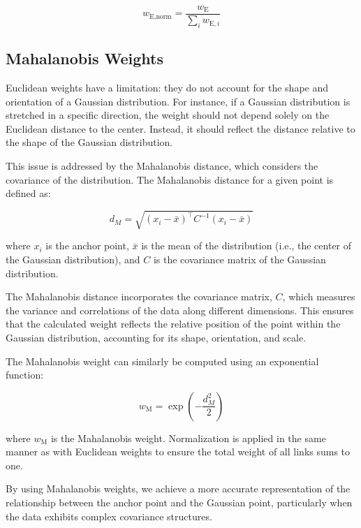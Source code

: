 \[
w_{\text{E}, \text{norm}} = \frac{w_{\text{E}}}{\sum_{i} w_{\text{E}, i}}
\]

\subsection{Mahalanobis Weights}

Euclidean weights have a limitation: they do not account for the shape and orientation of a Gaussian distribution. For instance, if a Gaussian distribution is stretched in a specific direction, the weight should not depend solely on the Euclidean distance to the center. Instead, it should reflect the distance relative to the shape of the Gaussian distribution.

This issue is addressed by the Mahalanobis distance, which considers the covariance of the distribution. The Mahalanobis distance for a given point is defined as:

\[
d_M = \sqrt{(x_i - \bar{x})^\top C^{-1} (x_i - \bar{x})}
\]

where \(x_i\) is the anchor point, \(\bar{x}\) is the mean of the distribution (i.e., the center of the Gaussian distribution), and \(C\) is the covariance matrix of the Gaussian distribution.

The Mahalanobis distance incorporates the covariance matrix, \(C\), which measures the variance and correlations of the data along different dimensions. This ensures that the calculated weight reflects the relative position of the point within the Gaussian distribution, accounting for its shape, orientation, and scale. 

The Mahalanobis weight can similarly be computed using an exponential function:

\[
w_{\text{M}} = \exp\left(-\frac{d_M^2}{2}\right)
\]

where \(w_{\text{M}}\) is the Mahalanobis weight. Normalization is applied in the same manner as with Euclidean weights to ensure the total weight of all links sums to one.

By using Mahalanobis weights, we achieve a more accurate representation of the relationship between the anchor point and the Gaussian point, particularly when the data exhibits complex covariance structures.
